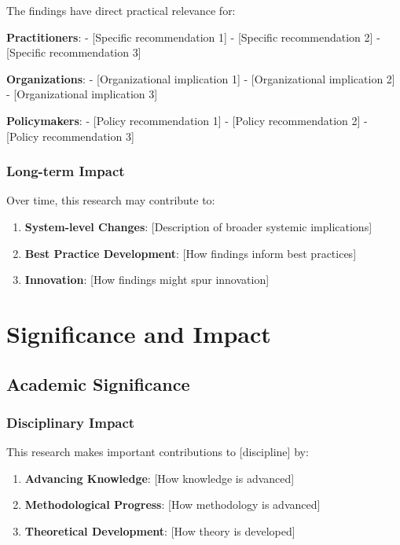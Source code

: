 \documentclass[
  12pt,
  letterpaper,
  12pt,
  letterpaper,
  oneside]{report}
\providecommand{\tightlist}{%
  \setlength{\itemsep}{0pt}\setlength{\parskip}{0pt}}
\begin{document}
The findings have direct practical relevance for:

\textbf{Practitioners}: - {[}Specific recommendation 1{]} - {[}Specific
recommendation 2{]} - {[}Specific recommendation 3{]}

\textbf{Organizations}: - {[}Organizational implication 1{]} -
{[}Organizational implication 2{]} - {[}Organizational implication 3{]}

\textbf{Policymakers}: - {[}Policy recommendation 1{]} - {[}Policy
recommendation 2{]} - {[}Policy recommendation 3{]}

\subsubsection{Long-term Impact}\label{long-term-impact}

Over time, this research may contribute to:

\begin{enumerate}
\def\labelenumi{\arabic{enumi}.}
\tightlist
\item
  \textbf{System-level Changes}: {[}Description of broader systemic
  implications{]}
\item
  \textbf{Best Practice Development}: {[}How findings inform best
  practices{]}
\item
  \textbf{Innovation}: {[}How findings might spur innovation{]}
\end{enumerate}

\section{Significance and Impact}\label{significance-and-impact}

\subsection{Academic Significance}\label{academic-significance}

\subsubsection{Disciplinary Impact}\label{disciplinary-impact}

This research makes important contributions to {[}discipline{]} by:

\begin{enumerate}
\def\labelenumi{\arabic{enumi}.}
\tightlist
\item
  \textbf{Advancing Knowledge}: {[}How knowledge is advanced{]}
\item
  \textbf{Methodological Progress}: {[}How methodology is advanced{]}
\item
  \textbf{Theoretical Development}: {[}How theory is developed{]}
\end{enumerate}
\end{document}
